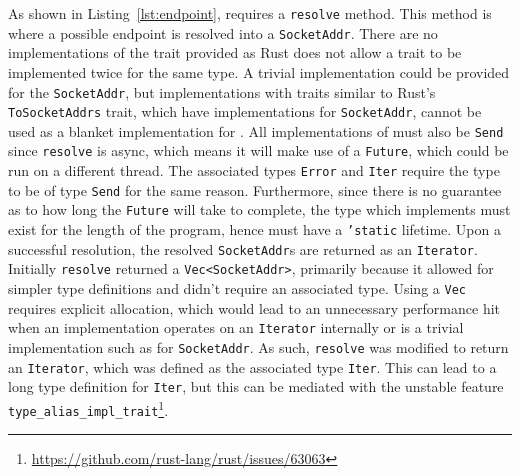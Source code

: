 As shown in Listing~\ref{lst:endpoint}, \Endpoint{} requires a \texttt{resolve} method.
This method is where a possible endpoint is resolved into a \texttt{SocketAddr}.
There are no implementations of the trait provided as Rust does not allow a trait to be implemented twice for the same
type.
A trivial implementation could be provided for the \texttt{SocketAddr}, but implementations with traits similar to
Rust's \texttt{ToSocketAddrs} trait, which have implementations for \texttt{SocketAddr}, cannot be used as a blanket
implementation for \Endpoint{}.
All implementations of \Endpoint{} must also be \texttt{Send} since \texttt{resolve} is async, which means it will
make use of a \texttt{Future}, which could be run on a different thread.
The associated types \texttt{Error} and \texttt{Iter} require the type to be of type \texttt{Send} for the same reason.
Furthermore, since there is no guarantee as to how long the \texttt{Future} will take to complete, the type which
implements \Endpoint{} must exist for the length of the program, hence must have a \texttt{'static} lifetime.
Upon a successful resolution, the resolved \texttt{SocketAddr}s are returned as an \texttt{Iterator}.
Initially \texttt{resolve} returned a \texttt{Vec<SocketAddr>}, primarily because it allowed for simpler type
definitions and didn't require an associated type.
Using a \texttt{Vec} requires explicit allocation, which would lead to an unnecessary performance hit when an
implementation operates on an \texttt{Iterator} internally or is a trivial implementation such as for
\texttt{SocketAddr}.
As such, \texttt{resolve} was modified to return an \texttt{Iterator}, which was defined as the associated type
\texttt{Iter}.
This can lead to a long type definition for \texttt{Iter}, but this can be mediated with the unstable feature
\texttt{type\_alias\_impl\_trait}\footnote{\url{https://github.com/rust-lang/rust/issues/63063}}.

